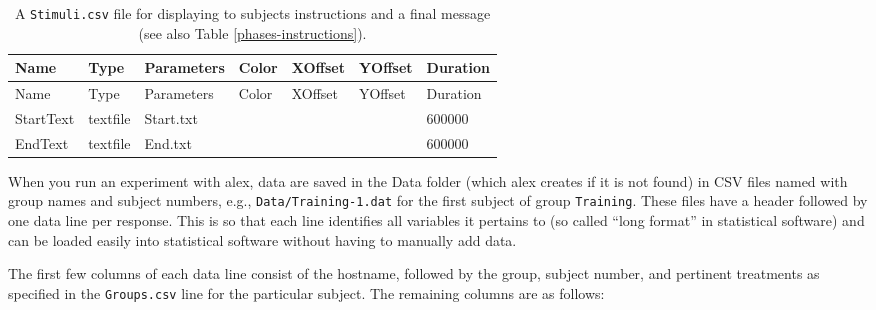 \documentclass[11pt,]{article}
\begin{document}
\begin{longtable}[c]{@{}lllllll@{}}
\caption{A \texttt{Stimuli.csv} file for displaying to subjects
instructions and a final message (see also Table
\ref{phases-instructions}). \label{stimuli-instructions}}\tabularnewline
\toprule
Name & Type & Parameters & Color & XOffset & YOffset &
Duration\tabularnewline
\midrule
\endfirsthead
\toprule
Name & Type & Parameters & Color & XOffset & YOffset &
Duration\tabularnewline
\midrule
\endhead
StartText & textfile & Start.txt & & & & 600000\tabularnewline
EndText & textfile & End.txt & & & & 600000\tabularnewline
\bottomrule
\end{longtable}


When you run an experiment with alex, data are saved in the Data folder
(which alex creates if it is not found) in CSV files named with group
names and subject numbers, e.g., \texttt{Data/Training-1.dat} for the
first subject of group \texttt{Training}. These files have a header
followed by one data line per response. This is so that each line
identifies all variables it pertains to (so called ``long format'' in
statistical software) and can be loaded easily into statistical software
without having to manually add data.

The first few columns of each data line consist of the hostname,
followed by the group, subject number, and pertinent treatments as
specified in the \texttt{Groups.csv} line for the particular subject.
The remaining columns are as follows:
\end{document}
